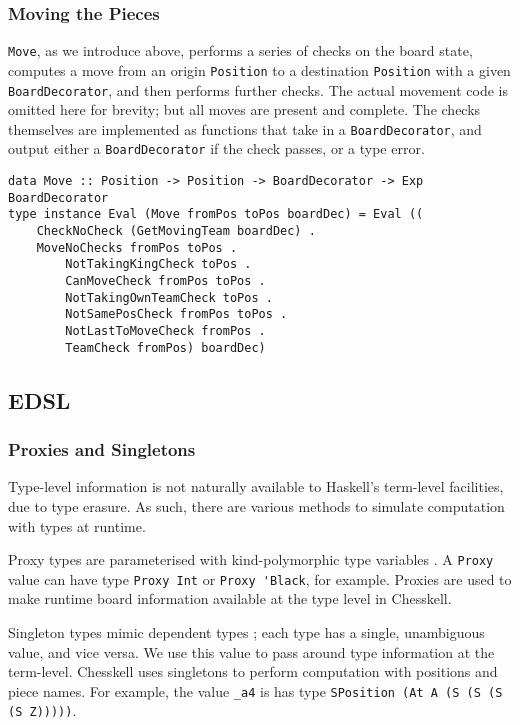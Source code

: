\documentclass[12pt, a4paper, bibliography=totocnumbered]{scrartcl}
\begin{document}
\subsubsection{Moving the Pieces}

\lstinline{Move}, as we introduce above, performs a series of checks on the board state, computes a move from an origin \lstinline{Position} to a destination \lstinline{Position} with a given \lstinline{BoardDecorator}, and then performs further checks. The actual movement code is omitted here for brevity; but all moves are present and complete. The checks themselves are implemented as functions that take in a \lstinline{BoardDecorator}, and output either a \lstinline{BoardDecorator} if the check passes, or a type error.

\begin{lstlisting}
data Move :: Position -> Position -> BoardDecorator -> Exp BoardDecorator
type instance Eval (Move fromPos toPos boardDec) = Eval ((
    CheckNoCheck (GetMovingTeam boardDec) .
    MoveNoChecks fromPos toPos .
        NotTakingKingCheck toPos .
        CanMoveCheck fromPos toPos .
        NotTakingOwnTeamCheck toPos .
        NotSamePosCheck fromPos toPos .
        NotLastToMoveCheck fromPos .
        TeamCheck fromPos) boardDec)
\end{lstlisting}

\subsection{EDSL}

\subsubsection{Proxies and Singletons}

Type-level information is not naturally available to Haskell's term-level facilities, due to type erasure. As such, there are various methods to simulate computation with types at runtime.

Proxy types are parameterised with kind-polymorphic type variables \cite{yorgey2012giving}. A \lstinline{Proxy} value can have type \lstinline{Proxy Int} or \lstinline{Proxy 'Black}, for example. Proxies are used to make runtime board information available at the type level in Chesskell.

Singleton types mimic dependent types \cite{singletons}; each type has a single, unambiguous value, and vice versa. We use this value to pass around type information at the term-level. Chesskell uses singletons to perform computation with positions and piece names. For example, the value \lstinline{_a4} is has type \lstinline{SPosition (At A (S (S (S (S Z)))))}.
\end{document}
